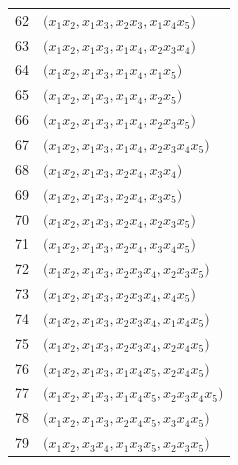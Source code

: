 {\begin{longtable}{@{}r>{\raggedright\arraybackslash}p{}@{}}
62 & \(\bigl(x_{1}x_{2},\allowbreak x_{1}x_{3},\allowbreak x_{2}x_{3},\allowbreak x_{1}x_{4}x_{5}\bigr)\) \\
63 & \(\bigl(x_{1}x_{2},\allowbreak x_{1}x_{3},\allowbreak x_{1}x_{4},\allowbreak x_{2}x_{3}x_{4}\bigr)\) \\
64 & \(\bigl(x_{1}x_{2},\allowbreak x_{1}x_{3},\allowbreak x_{1}x_{4},\allowbreak x_{1}x_{5}\bigr)\) \\
65 & \(\bigl(x_{1}x_{2},\allowbreak x_{1}x_{3},\allowbreak x_{1}x_{4},\allowbreak x_{2}x_{5}\bigr)\) \\
66 & \(\bigl(x_{1}x_{2},\allowbreak x_{1}x_{3},\allowbreak x_{1}x_{4},\allowbreak x_{2}x_{3}x_{5}\bigr)\) \\
67 & \(\bigl(x_{1}x_{2},\allowbreak x_{1}x_{3},\allowbreak x_{1}x_{4},\allowbreak x_{2}x_{3}x_{4}x_{5}\bigr)\) \\
68 & \(\bigl(x_{1}x_{2},\allowbreak x_{1}x_{3},\allowbreak x_{2}x_{4},\allowbreak x_{3}x_{4}\bigr)\) \\
69 & \(\bigl(x_{1}x_{2},\allowbreak x_{1}x_{3},\allowbreak x_{2}x_{4},\allowbreak x_{3}x_{5}\bigr)\) \\
70 & \(\bigl(x_{1}x_{2},\allowbreak x_{1}x_{3},\allowbreak x_{2}x_{4},\allowbreak x_{2}x_{3}x_{5}\bigr)\) \\
71 & \(\bigl(x_{1}x_{2},\allowbreak x_{1}x_{3},\allowbreak x_{2}x_{4},\allowbreak x_{3}x_{4}x_{5}\bigr)\) \\
72 & \(\bigl(x_{1}x_{2},\allowbreak x_{1}x_{3},\allowbreak x_{2}x_{3}x_{4},\allowbreak x_{2}x_{3}x_{5}\bigr)\) \\
73 & \(\bigl(x_{1}x_{2},\allowbreak x_{1}x_{3},\allowbreak x_{2}x_{3}x_{4},\allowbreak x_{4}x_{5}\bigr)\) \\
74 & \(\bigl(x_{1}x_{2},\allowbreak x_{1}x_{3},\allowbreak x_{2}x_{3}x_{4},\allowbreak x_{1}x_{4}x_{5}\bigr)\) \\
75 & \(\bigl(x_{1}x_{2},\allowbreak x_{1}x_{3},\allowbreak x_{2}x_{3}x_{4},\allowbreak x_{2}x_{4}x_{5}\bigr)\) \\
76 & \(\bigl(x_{1}x_{2},\allowbreak x_{1}x_{3},\allowbreak x_{1}x_{4}x_{5},\allowbreak x_{2}x_{4}x_{5}\bigr)\) \\
77 & \(\bigl(x_{1}x_{2},\allowbreak x_{1}x_{3},\allowbreak x_{1}x_{4}x_{5},\allowbreak x_{2}x_{3}x_{4}x_{5}\bigr)\) \\
78 & \(\bigl(x_{1}x_{2},\allowbreak x_{1}x_{3},\allowbreak x_{2}x_{4}x_{5},\allowbreak x_{3}x_{4}x_{5}\bigr)\) \\
79 & \(\bigl(x_{1}x_{2},\allowbreak x_{3}x_{4},\allowbreak x_{1}x_{3}x_{5},\allowbreak x_{2}x_{3}x_{5}\bigr)\) \\

\end{longtable}}
